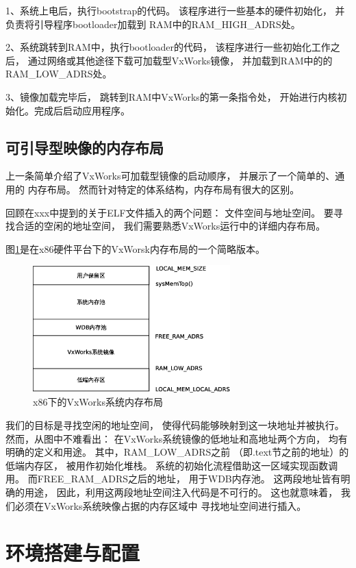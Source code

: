 1、系统上电后，执行bootstrap的代码。
该程序进行一些基本的硬件初始化，
并负责将引导程序bootloader加载到
RAM中的RAM\_HIGH\_ADRS处。

2、系统跳转到RAM中，执行bootloader的代码，
该程序进行一些初始化工作之后，
通过网络或其他途径下载可加载型VxWorks镜像，
并加载到RAM中的的RAM\_LOW\_ADRS处。

3、镜像加载完毕后，
跳转到RAM中VxWorks的第一条指令处，
开始进行内核初始化。完成后启动应用程序。


\subsection{可引导型映像的内存布局}

上一条简单介绍了VxWorks可加载型镜像的启动顺序，
并展示了一个简单的、通用的
内存布局。
然而针对特定的体系结构，内存布局有很大的区别。

回顾在xxx中提到的关于ELF文件插入的两个问题：
文件空间与地址空间。
要寻找合适的空闲的地址空间，
我们需要熟悉VxWorks运行中的详细内存布局。

图\ref{ram}是在x86硬件平台下的VxWorsk内存布局的一个简略版本。

\begin{figure}[h!]
    \centering
    \includegraphics[width=0.68\textwidth]{figure/ram.eps}
    \caption{x86下的VxWorks系统内存布局}
    \label{ram}
\end{figure}

我们的目标是寻找空闲的地址空间，
使得代码能够映射到这一块地址并被执行。
然而，从图中不难看出：
在VxWorks系统镜像的低地址和高地址两个方向，
均有明确的定义和用途。
其中，RAM\_LOW\_ADRS之前
（即.text节之前的地址）的低端内存区，
被用作初始化堆栈。
系统的初始化流程借助这一区域实现函数调用。
而FREE\_RAM\_ADRS之后的地址，
用于WDB内存池。
这两段地址皆有明确的用途，
因此，利用这两段地址空间注入代码是不可行的。
这也就意味着，
我们必须在VxWorks系统映像占据的内存区域中
寻找地址空间进行插入。


\section{环境搭建与配置}

